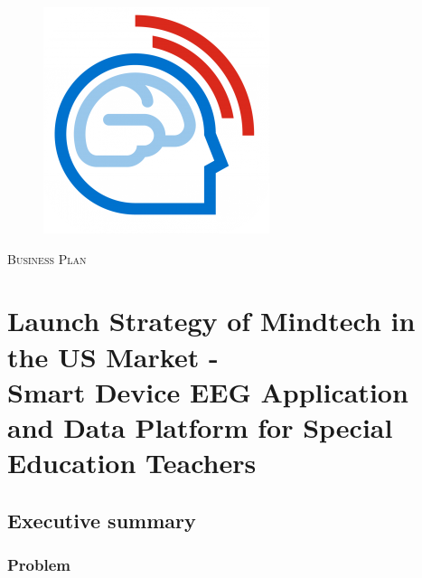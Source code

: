 \documentclass[letterpaper,10pt]{article}
\let\oldsection\section
\let\oldsubsection\subsection
\renewcommand{\section}{\def\cursectioning{section}\oldsection}
\renewcommand{\subsection}{\def\cursectioning{subsection}\oldsubsection}
\begin{document}
\newpage










\begin{centering}

\pagestyle{empty}

\begin{figure}[H]
\centering
\includegraphics[scale=0.36]{Mindtech.png}
\end{figure}

\begin{tightcenter}
\vspace*{3cm}
\large{\textsc{Business Plan}}
\vspace*{2.5cm}

\section{\huge{\textbf{Launch Strategy of Mindtech in the US Market - \\ Smart Device EEG Application and Data Platform for Special Education Teachers}}}


\end{tightcenter}
\end{centering}

\newpage
\pagestyle{plain}



\subsection{Executive summary}


\subsubsection{Problem}
\end{document}
